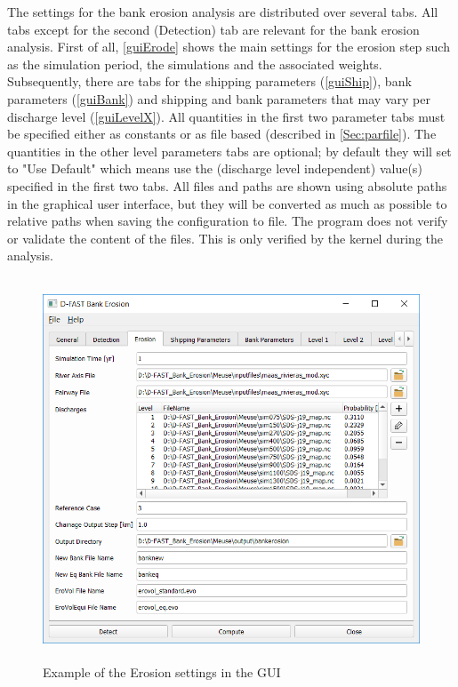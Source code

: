 The settings for the bank erosion analysis are distributed over several tabs.
All tabs except for the second (Detection) tab are relevant for the bank erosion analysis.
First of all, \autoref{guiErode} shows the main settings for the erosion step such as the simulation period, the simulations and the associated weights.
Subsequently, there are tabs for the shipping parameters (\autoref{guiShip}), bank parameters (\autoref{guiBank}) and shipping and bank parameters that may vary per discharge level (\autoref{guiLevelX}).
All quantities in the first two parameter tabs must be specified either as constants or as file based (described in \autoref{Sec:parfile}).
The quantities in the other level parameters tabs are optional; by default they will set to "Use Default" which means use the (discharge level independent) value(s) specified in the first two tabs.
All files and paths are shown using absolute paths in the graphical user interface, but they will be converted as much as possible to relative paths when saving the configuration to file.
The program does not verify or validate the content of the files.
This is only verified by the kernel during the analysis.
\begin{figure}[!hb]
\center
\includegraphics[width=\textwidth,height=11.4cm]{figures/gui3.png}
\caption{Example of the Erosion settings in the GUI}
\label{guiErode}
\end{figure}

